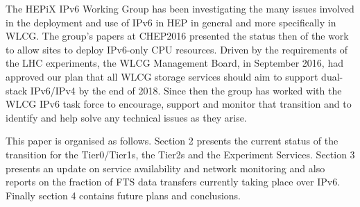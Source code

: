 
The HEPiX IPv6 Working Group \cite{ipv6wg} has been investigating the many issues involved in the deployment and use of
IPv6 in HEP in general and more specifically in WLCG. The group's papers at CHEP2016 \cite{ipv6chep2016}
presented the status then of the work to allow sites to deploy IPv6-only CPU resources. Driven by the
requirements of the LHC experiments, the WLCG Management Board, in September 2016, had approved our plan
that all WLCG storage services should aim to support dual-stack IPv6/IPv4 by the end of 2018. Since then the
group has worked with the WLCG IPv6 task force to encourage, support and monitor that transition and to identify and help
solve any technical issues as they arise.

This paper is organised as follows.  Section 2 presents the current status of the transition for the Tier0/Tier1s, the Tier2s and the Experiment Services.
Section 3 presents an update on service availability and network monitoring and also reports on the fraction of FTS data transfers currently taking place over IPv6.
Finally section 4 contains future plans and conclusions. 

 
